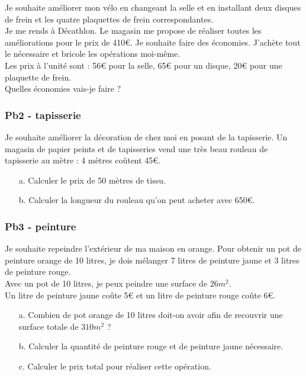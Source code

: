 Je souhaite améliorer mon vélo en changeant la selle et en installant deux disques de frein et les quatre plaquettes de frein correspondantes. \\

Je me rends à Décathlon. Le magasin me propose de réaliser toutes les améliorations pour le prix de 410€. Je souhaite faire des économies. J'achète tout le nécessaire et bricole les opérations moi-même. \\

Les prix à l'unité sont : 56€ pour la selle, 65€ pour un disque, 20€ pour une plaquette de frein.\\

Quelles économies vais-je faire ?

\subsubsection*{Pb2 - tapisserie}

Je souhaite améliorer la décoration de chez moi en posant de la tapisserie. Un magasin de papier peints et de tapisseries vend une très beau rouleau de tapisserie au mètre : 4 mètres coûtent 45€.

\begin{enumerate}
  \item[a.] Calculer le prix de 50 mètres de tissu.
  \item[b.] Calculer la longueur du rouleau qu'on peut acheter avec 650€.
\end{enumerate}  


\subsubsection*{Pb3 - peinture} 

Je souhaite repeindre l'extérieur de ma maison en orange. Pour obtenir un pot de peinture orange de 10 litres, je dois mélanger 7 litres de peinture jaune et 3 litres de peinture rouge.\\ 

Avec un pot de 10 litres, je peux peindre une surface de $26m^2$. \\

Un litre de peinture jaune coûte 5€ et un litre de peinture rouge coûte 6€. 

\begin{enumerate}
  \item[a.] Combien de pot orange de 10 litres doit-on avoir afin de recouvrir une surface totale de $310m^2$ ?
  \item[b.] Calculer la quantité de peinture rouge et de peinture jaune nécessaire.
  \item[c.] Calculer le prix total pour réaliser cette opération.  
\end{enumerate}

